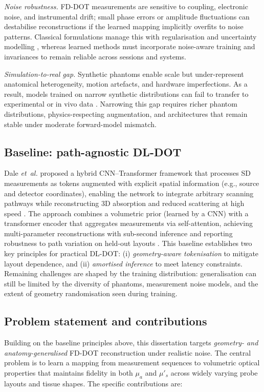 \textit{Noise robustness.} FD-DOT measurements are sensitive to coupling, electronic noise, and instrumental drift; small phase errors or amplitude fluctuations can destabilise reconstructions if the learned mapping implicitly overfits to noise patterns. Classical formulations manage this with regularisation and uncertainty modelling \cite{arridge1999,tarvainen2010boe}, whereas learned methods must incorporate noise-aware training and invariances to remain reliable across sessions and systems.

\textit{Simulation-to-real gap.} Synthetic phantoms enable scale but under-represent anatomical heterogeneity, motion artefacts, and hardware imperfections. As a result, models trained on narrow synthetic distributions can fail to transfer to experimental or in vivo data \cite{gibson2005,arridge2009}. Narrowing this gap requires richer phantom distributions, physics-respecting augmentation, and architectures that remain stable under moderate forward-model mismatch.

\subsection{Baseline: path-agnostic DL-DOT}
Dale \emph{et~al.} proposed a hybrid CNN–Transformer framework that processes SD measurements as tokens augmented with explicit spatial information (e.g., source and detector coordinates), enabling the network to integrate arbitrary scanning pathways while reconstructing 3D absorption and reduced scattering at high speed \cite{dale2024}. The approach combines a volumetric prior (learned by a CNN) with a transformer encoder that aggregates measurements via self-attention, achieving multi-parameter reconstructions with sub-second inference and reporting robustness to path variation on held-out layouts \cite{dale2024, dale2025, dale2025thesis}. This baseline establishes two key principles for practical DL-DOT: (i) \emph{geometry-aware tokenisation} to mitigate layout dependence, and (ii) \emph{amortised inference} to meet latency constraints. Remaining challenges are shaped by the training distribution: generalisation can still be limited by the diversity of phantoms, measurement noise models, and the extent of geometry randomisation seen during training.

\subsection{Problem statement and contributions}
Building on the baseline principles above, this dissertation targets \emph{geometry- and anatomy-generalised} FD-DOT reconstruction under realistic noise. The central problem is to learn a mapping from measurement sequences to volumetric optical properties that maintains fidelity in both $\mu_a$ and $\mu'_s$ across widely varying probe layouts and tissue shapes. The specific contributions are:

